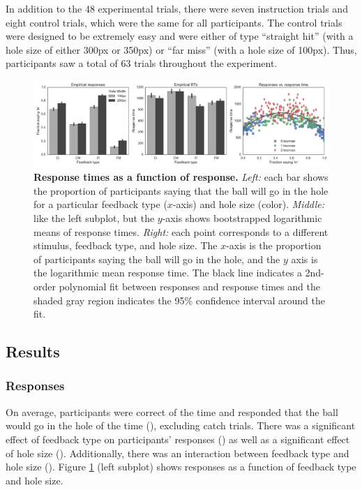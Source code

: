 \documentclass[10pt,letterpaper]{article}
\begin{document}
In addition to the 48 experimental trials, there were seven instruction trials and eight control trials, which were the same for all participants.
The control trials were designed to be extremely easy and were either of type ``straight hit'' (with a hole size of either 300px or 350px) or ``far miss'' (with a hole size of 100px).
Thus, participants saw a total of 63 trials throughout the experiment.

\begin{figure}[t]
    \begin{center}
        \includegraphics[width=\textwidth]{figures/hole_empirical_results.pdf}
        \caption{\textbf{Response times as a function of response.} \emph{Left:} each bar shows the proportion of participants saying that the ball will go in the hole for a particular feedback type ($x$-axis) and hole size (color). \emph{Middle:} like the left subplot, but the $y$-axis shows bootstrapped logarithmic means of response times. \emph{Right:} each point corresponds to a different stimulus, feedback type, and hole size.  The $x$-axis is the proportion of participants saying the ball will go in the hole, and the $y$ axis is the logarithmic mean response time. The black line indicates a 2nd-order polynomial fit between responses and response times and the shaded gray region indicates the 95\% confidence interval around the fit.}
        \label{fig:pct-vs-rt}
    \end{center}
\end{figure}

\subsection{Results}

\subsubsection{Responses}

On average, participants were correct \AvgCorrect{} of the time and responded that the ball would go in the hole \AvgResponse{} of the time (\ResponseN{}), excluding catch trials.
There was a significant effect of feedback type on participants' responses (\ResponseHoleClass{}) as well as a significant effect of hole size (\ResponseHoleSize{}).
Additionally, there was an interaction between feedback type and hole size (\ResponseFull{}).
Figure \ref{fig:pct-vs-rt} (left subplot) shows responses as a function of feedback type and hole size.
\end{document}
